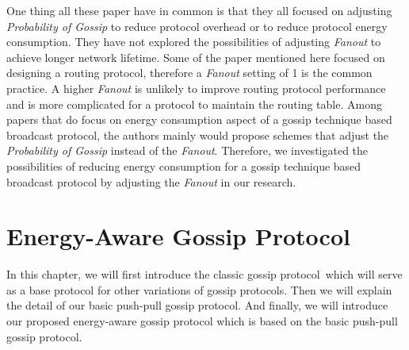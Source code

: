 \documentclass[onehalf,11pt]{beavtex}
\newcommand{\gp}{gossip protocol}
\newcommand{\pog}{Probability of Gossip}
\newcommand{\msg}{message}
\begin{document}

One thing all these paper have in common is that they all focused on adjusting \emph{\pog} to reduce protocol overhead or to reduce protocol energy consumption. They have not explored the possibilities of adjusting \emph{Fanout} to achieve longer network lifetime. Some of the paper mentioned here focused on designing a routing protocol, therefore a \emph{Fanout} setting of 1 is the common practice. A higher \emph{Fanout} is unlikely to improve routing protocol performance and is more complicated for a protocol to maintain the routing table. Among papers that do focus on energy consumption aspect of a gossip technique based broadcast protocol, the authors mainly would propose schemes that adjust the \emph{\pog} instead of the \emph{Fanout}. Therefore, we investigated the possibilities of reducing energy consumption for a gossip technique based broadcast protocol by adjusting the \emph{Fanout} in our research.





\chapter{Energy-Aware Gossip Protocol}
\label{Chapter3}

In this chapter, we will first introduce the classic \gp ~which will serve as a base protocol for other variations of gossip protocols. Then we will explain the detail of our basic push-pull \gp. And finally, we will introduce our proposed energy-aware gossip protocol which is based on the basic push-pull \gp.
\end{document}
